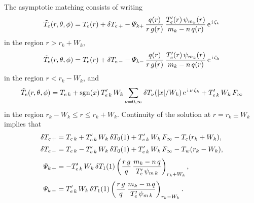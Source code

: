 \documentclass[12pt,prb,aps,notitlepage]{revtex4-1}
\begin{document}
The asymptotic matching consists of writing
\begin{equation}
\tilde{T}_e(r,\theta,\phi) = T_e(r) + \delta T_{e\,+} - {\mit\Psi}_{k+}\,\frac{q(r)}{r\,g(r)}\,\frac{T_e'(r)\,\psi_{m_k}(r)}{m_k-n\,q(r)}\,{\rm e}^{\,{\rm i}\,\zeta_k}
\end{equation}
in the region $r>r_k+W_k$, 
\begin{equation}
\tilde{T}_e(r,\theta,\phi) = T_e(r) + \delta T_{e\,-} - {\mit\Psi}_{k-}\,\frac{q(r)}{r\,g(r)}\,\frac{T_e'(r)\,\psi_{m_k}(r)}{m_k-n\,q(r)}\,{\rm e}^{\,{\rm i}\,\zeta_k}
\end{equation}
in the region $r< r_k-W_k$, and 
\begin{equation}
\tilde{T}_e(r, \theta,\phi)=T_{e\,k} +{\rm sgn}(x)\,T_{e\,k}'\,W_k\sum_{\nu=0,\infty}\delta T_\nu(|x|/W_k)\,{\rm e}^{\,{\rm i}\,\nu\,\zeta_k}+T_{e\,k}'\,W_k\,F_\infty
\end{equation}
in the region $r_k-W_k \leq r\leq r_k+W_k$. Continuity of the solution at $r=r_k\pm W_k$ implies that
\begin{align}
\delta T_{e\,+} &= T_{e\,k} + T_{e\,k}'\,W_k\,\delta T_0(1)+T_{e\,k}'\,W_k\,F_\infty - T_e(r_k+W_k),\\[0.5ex]
\delta T_{e\,-} &= T_{e\,k} - T_{e\,k}'\,W_k\,\delta T_0(1) +T_{e\,k}'\,W_k\,F_\infty- T_w(r_k-W_k),\\[0.5ex]
{\mit\Psi}_{k\,+} &= - T_{e\,k}'\,W_k\,\delta T_1(1)\left(\frac{r\,g}{q}\,\frac{m_k-n\,q}{T_e'\,\psi_{m\,k}}\right)_{r_k+W_k},\\[0.5ex]
{\mit\Psi}_{k\,-} &= T_{e\,k}'\,W_k\,\delta T_1(1)\left(\frac{r\,g}{q}\,\frac{m_k-n\,q}{T_e'\,\psi_{m\,k}}\right)_{r_k-W_k}.
\end{align}
\end{document}
